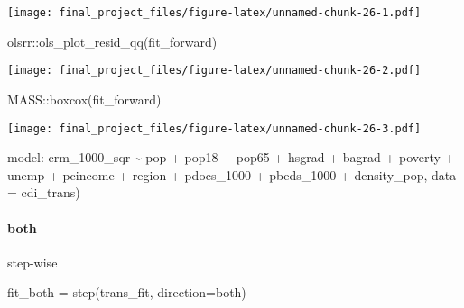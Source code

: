 \documentclass[
]{article}
\newenvironment{Shaded}{\begin{snugshade}}{\end{snugshade}}
\newcommand{\AttributeTok}[1]{\textcolor[rgb]{0.77,0.63,0.00}{#1}}
\newcommand{\FunctionTok}[1]{\textcolor[rgb]{0.00,0.00,0.00}{#1}}
\newcommand{\NormalTok}[1]{#1}
\newcommand{\OtherTok}[1]{\textcolor[rgb]{0.56,0.35,0.01}{#1}}
\newcommand{\SpecialCharTok}[1]{\textcolor[rgb]{0.00,0.00,0.00}{#1}}
\newcommand{\StringTok}[1]{\textcolor[rgb]{0.31,0.60,0.02}{#1}}
\begin{document}
\texttt{[image: final\_project\_files/figure-latex/unnamed-chunk-26-1.pdf]}

\begin{Shaded}
\begin{Highlighting}[]
\NormalTok{olsrr}\SpecialCharTok{::}\FunctionTok{ols\_plot\_resid\_qq}\NormalTok{(fit\_forward)}
\end{Highlighting}
\end{Shaded}

\texttt{[image: final\_project\_files/figure-latex/unnamed-chunk-26-2.pdf]}

\begin{Shaded}
\begin{Highlighting}[]
\NormalTok{MASS}\SpecialCharTok{::}\FunctionTok{boxcox}\NormalTok{(fit\_forward)}
\end{Highlighting}
\end{Shaded}

\texttt{[image: final\_project\_files/figure-latex/unnamed-chunk-26-3.pdf]}

model: crm\_1000\_sqr \textasciitilde{} pop + pop18 + pop65 + hsgrad +
bagrad + poverty + unemp + pcincome + region + pdocs\_1000 + pbeds\_1000
+ density\_pop, data = cdi\_trans)

\hypertarget{both}{%
\paragraph{both}\label{both}}

step-wise

\begin{Shaded}
\begin{Highlighting}[]
\NormalTok{fit\_both }\OtherTok{=} \FunctionTok{step}\NormalTok{(trans\_fit, }\AttributeTok{direction=}\StringTok{\textquotesingle{}both\textquotesingle{}}\NormalTok{)}
\end{Highlighting}
\end{Shaded}
\end{document}
